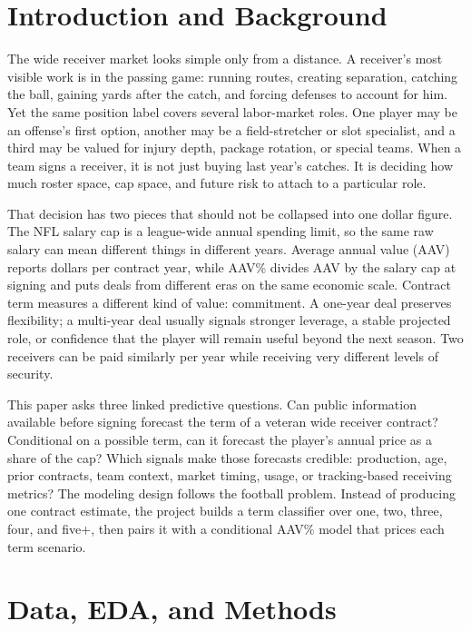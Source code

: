 \documentclass[
  10pt,
]{article}
\begin{document}
\section{Introduction and Background}\label{introduction-and-background}

The wide receiver market looks simple only from a distance. A receiver's most visible work is in the passing game: running routes, creating separation, catching the ball, gaining yards after the catch, and forcing defenses to account for him. Yet the same position label covers several labor-market roles. One player may be an offense's first option, another may be a field-stretcher or slot specialist, and a third may be valued for injury depth, package rotation, or special teams. When a team signs a receiver, it is not just buying last year's catches. It is deciding how much roster space, cap space, and future risk to attach to a particular role.

That decision has two pieces that should not be collapsed into one dollar figure. The NFL salary cap is a league-wide annual spending limit, so the same raw salary can mean different things in different years. Average annual value (AAV) reports dollars per contract year, while AAV\% divides AAV by the salary cap at signing and puts deals from different eras on the same economic scale. Contract term measures a different kind of value: commitment. A one-year deal preserves flexibility; a multi-year deal usually signals stronger leverage, a stable projected role, or confidence that the player will remain useful beyond the next season. Two receivers can be paid similarly per year while receiving very different levels of security.

This paper asks three linked predictive questions. Can public information available before signing forecast the term of a veteran wide receiver contract? Conditional on a possible term, can it forecast the player's annual price as a share of the cap? Which signals make those forecasts credible: production, age, prior contracts, team context, market timing, usage, or tracking-based receiving metrics? The modeling design follows the football problem. Instead of producing one contract estimate, the project builds a term classifier over one, two, three, four, and five+, then pairs it with a conditional AAV\% model that prices each term scenario.

\section{Data, EDA, and Methods}\label{data-eda-and-methods}
\end{document}
